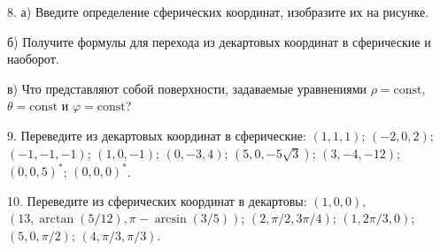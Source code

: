 \documentclass[14pt]{article}
\begin{document}
8. а) Введите определение сферических координат, изобразите их на рисунке.

б) Получите формулы для перехода из декартовых координат в сферические и наоборот.

в) Что представляют собой поверхности, задаваемые уравнениями $\rho=\text{const}$, $\theta=\text{const}$ и $\varphi=\text{const}$?

9. Переведите из декартовых координат в сферические: $(1,1,1)$; $(-2,0,2)$; $(-1,-1,-1)$; $(1,0,-1)$; $(0,-3,4)$; $(5,0,-5\sqrt3)$; $(3,-4,-12)$; $(0,0,5)^*$; $(0,0,0)^*$.

10. Переведите из сферических координат в декартовы: $(1,0,0)$, $(13,\arctan(5/12),\pi-\arcsin(3/5))$; $(2,\pi/2,3\pi/4)$; $(1,2\pi/3,0)$; $(5,0,\pi/2)$; $(4,\pi/3,\pi/3)$.
\end{document}
